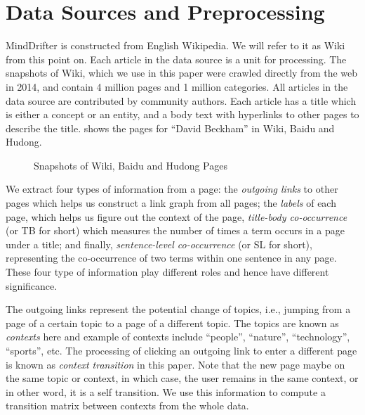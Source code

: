 \section{Data Sources and Preprocessing}
\label{sec:data}
MindDrifter is constructed from English Wikipedia. We will refer to it as Wiki 
from this point on.
Each article in the data source is 
a unit for processing. The snapshots of Wiki, which
we use in this paper were crawled directly from the web in 2014,
and contain 4 million pages and 1 million categories.
All articles in the data source are contributed by community	
authors. Each article has a title which is either a concept or an entity,
and a body text with hyperlinks to other pages to describe the title.
 shows the pages for ``David Beckham'' in Wiki, Baidu
and Hudong.

\begin{figure*}[th]
\centering
\caption{Snapshots of Wiki, Baidu and Hudong Pages}
\label{fig:wikipage}
\shrink
\end{figure*}

We extract four types of information
from a page: the {\em outgoing links} to other pages which helps us
construct a link graph from all pages;
the {\em labels} of each page, which helps us 
figure out the context of the page, 
{\em title-body co-occurrence} (or TB for short)
which measures the number of times a term
occurs in a page under a title;
and finally, {\em sentence-level co-occurrence} (or SL for short),
representing the co-occurrence of two terms within one sentence in any page.
These four type of information play different roles and hence have different
significance.

The outgoing links represent the potential change of topics,
i.e., jumping from a page of a certain topic to a page of a different topic.
The topics are known as {\em contexts} here and
example of contexts include ``people'', ``nature'', ``technology'',
``sports'', etc. The processing of clicking an outgoing
link to enter a different page is known as {\em context transition}
in this paper. Note that the new page maybe on the same topic or context,
in which case, the user remains in the same context, or in other word, it is
a self transition. We use this information to compute a transition matrix
between contexts from the whole data.

